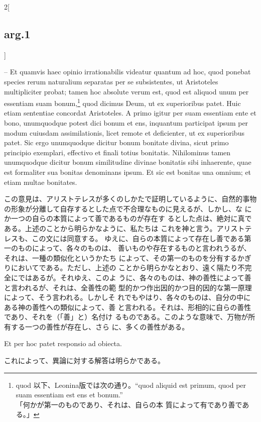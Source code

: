 \documentclass[paper=a4paper,fontsize=10pt,jafontsize=9pt,titlepage]{jlreq}
\begin{document}
\begin{paracol}{2}[\subsection{arg.1}]
\switchcolumn*

-- Et quamvis haec opinio irrationabilis videatur
 quantum ad hoc, quod ponebat species rerum naturalium separatas per se
 subsistentes, ut Aristoteles multipliciter probat; tamen hoc absolute
 verum est, quod est aliquod unum per essentiam suam bonum,\footnote{quod
 以下、Leonina版では次の通り。``quod aliquid est primum, quod per suam
 essentiam est ens et bonum.''\\「何かが第一のものであり、それは、自らの本
 質によって有であり善である。」} quod
 dicimus Deum, ut ex superioribus patet. Huic etiam sententiae concordat
 Aristoteles. A primo igitur per suam essentiam ente et bono,
 unumquodque potest dici bonum et ens, inquantum participat ipsum per
 modum cuiusdam assimilationis, licet remote et deficienter, ut ex
 superioribus patet. Sic ergo unumquodque dicitur bonum bonitate divina,
 sicut primo principio exemplari, effectivo et finali totius
 bonitatis. Nihilominus tamen unumquodque dicitur bonum similitudine
 divinae bonitatis sibi inhaerente, quae est formaliter sua bonitas
 denominans ipsum. Et sic est bonitas una omnium; et etiam multae
 bonitates.

\switchcolumn

この意見は、アリストテレスが多くのしかたで証明しているように、自然的事物
 の形象が分離して自存するとした点で不合理なものに見えるが、しかし、な
 にか一つの自らの本質によって善であるものが存在す
 るとした点は、絶対に真である。上述のことから明らかなように、私たちは
 これを神と言う。アリストテレスも、この文には同意する。
ゆえに、自らの本質によって存在し善である第一のものによって、各々のものは、
 善いものや存在するものと言われうるが、それは、一種の類似化というかたち
 によって、その第一のものを分有するかぎりにおいてである。ただし、上述の
 ことから明らかなとおり、遠く隔たり不完全にではあるが。それゆえ、このよ
 うに、各々のものは、神の善性によって善と言われるが、それは、全善性の範
 型的かつ作出因的かつ目的因的な第一原理によって、そう言われる。しかしそ
 れでもやはり、各々のものは、自分の中にある神の善性への類似によって、善
 と言われる。それは、形相的に自らの善性であり、それを（「善」と）名付け
 るものである。このような意味で、万物が所有する一つの善性が存在し、さら
 に、多くの善性がある。

\switchcolumn*

Et per hoc patet responsio ad obiecta.

\switchcolumn

これによって、異論に対する解答は明らかである。

\end{paracol}
\end{document}
